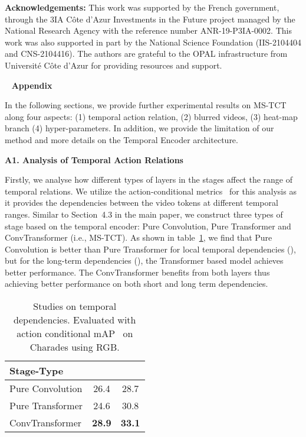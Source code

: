 \documentclass[10pt,twocolumn,letterpaper]{article}
\begin{document}
\vspace{0.1in}
\noindent\textbf{Acknowledgements:} 
This work was supported by the French government, through the 3IA Côte d’Azur Investments in the Future project managed by the National Research Agency with the reference number ANR-19-P3IA-0002. This work was also supported in part by the National Science Foundation (IIS-2104404 and CNS-2104416). The authors are grateful to the OPAL infrastructure from Université Côte d'Azur for providing resources and support.



{\small


}
\newpage 
~
\newpage 
\noindent\textbf{\LARGE{Appendix}} 
\vspace{0.1in}

\noindent In the following sections, we provide further experimental results on MS-TCT along four aspects: (1) temporal action relation, (2) blurred videos, (3) heat-map branch (4) hyper-parameters. In addition, we provide the limitation of our method and more details on the Temporal Encoder architecture.


\vspace{0.1in}
\noindent \textbf{\large{A1. Analysis of Temporal Action Relations}}
\vspace{0.1in}

Firstly, we analyse how different types of layers in the stages affect the range of temporal relations. 
We utilize the action-conditional metrics~\cite{MLAD} for this analysis as it provides the dependencies between the video tokens at different temporal ranges. 
Similar to Section~4.3 in the main paper, we construct three types of stage based on the temporal encoder: Pure Convolution, Pure Transformer and ConvTransformer (i.e., MS-TCT). 
As shown in table~\ref{tab:dependencies}, we find that Pure Convolution is better than Pure Transformer for local temporal dependencies (), but for the long-term dependencies (), the Transformer based model achieves better performance. 
The ConvTransformer benefits from both layers thus achieving better performance on both short and long term dependencies.

\begin{table}[h]
\caption{Studies on temporal dependencies. Evaluated with action conditional mAP~\cite{MLAD} on Charades using RGB.}
\label{tab:dependencies}
\begin{tabular}{l|cc}
\hline
Stage-Type       &   &   \\\hline
Pure Convolution & 26.4 & 28.7 \\
Pure Transformer  & 24.6 & 30.8 \\
ConvTransformer  & \textbf{28.9} & \textbf{33.1}    \\ \hline
\end{tabular}
\end{table}
\end{document}
